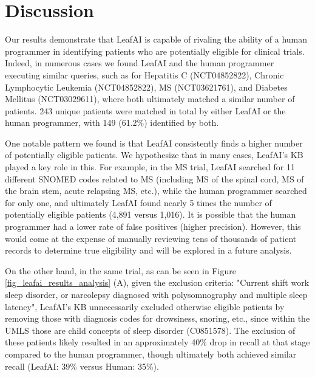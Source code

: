 \documentclass[../main.tex]{subfiles}
\begin{document}
\section{Discussion}

Our results demonstrate that LeafAI is capable of rivaling the ability of a human programmer in identifying patients who are potentially eligible for  clinical trials. Indeed, in numerous cases we found LeafAI and the human programmer executing similar queries, such as for Hepatitis C (NCT04852822), Chronic Lymphocytic Leukemia (NCT04852822), MS (NCT03621761), and Diabetes Mellitus (NCT03029611), where both ultimately matched a similar number of patients. 243 unique patients were matched in total by either LeafAI or the human programmer, with 149 (61.2\%) identified by both.

One notable pattern we found is that LeafAI consistently finds a higher number of potentially eligible patients. We hypothesize that in many cases, LeafAI’s KB played a key role in this. For example, in the MS trial, LeafAI searched for 11 different SNOMED codes related to MS (including MS of the spinal cord, MS of the brain stem, acute relapsing MS, etc.), while the human programmer searched for only one, and ultimately LeafAI found nearly 5 times the number of potentially eligible patients (4,891 versus 1,016). It is possible that the human programmer had a lower rate of false positives (higher precision). However, this would come at the expense of manually reviewing tens of thousands of patient records to determine true eligibility and will be explored in a future analysis.  

On the other hand, in the same trial, as can be seen in Figure \ref{fig_leafai_results_analysis} (A), given the exclusion criteria: "Current shift work sleep disorder, or narcolepsy diagnosed with polysomnography and multiple sleep latency", LeafAI’s KB unnecessarily excluded otherwise eligible patients by removing those with diagnosis codes for drowsiness, snoring, etc., since within the UMLS those are child concepts of sleep disorder (C0851578). The exclusion of these patients likely resulted in an approximately 40\% drop in recall at that stage compared to the human programmer, though ultimately both achieved similar recall (LeafAI: 39\% versus Human: 35\%).
\end{document}
